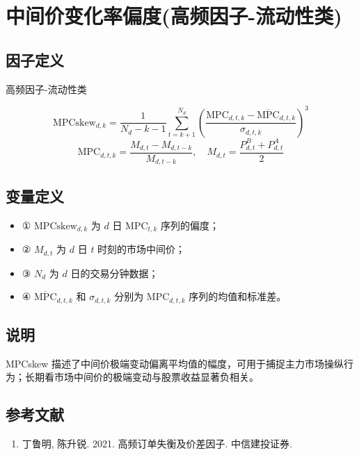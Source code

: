 \documentclass{article}
\begin{document}
\section{中间价变化率偏度(高频因子-流动性类)}

\subsection{因子定义}
高频因子-流动性类

\begin{equation}
    \mathrm{MPCskew}_{d,k} = \frac{1}{N_d - k - 1} \sum_{t=k+1}^{N_d} \left( \frac{\mathrm{MPC}_{d,t,k} - \overline{\mathrm{MPC}}_{d,t,k}}{\sigma_{d,t,k}} \right)^3
\end{equation}
\begin{equation}
    \mathrm{MPC}_{d,t,k} = \frac{M_{d,t} - M_{d,t-k}}{M_{d,t-k}}, \quad M_{d,t} = \frac{P_{d,t}^B + P_{d,t}^A}{2}
\end{equation}

\subsection{变量定义}
\begin{itemize}
    \item ① \( \mathrm{MPCskew}_{d,k} \) 为 \( d \) 日 \( \mathrm{MPC}_{t,k} \) 序列的偏度；
    \item ② \( M_{d,t} \) 为 \( d \) 日 \( t \) 时刻的市场中间价；
    \item ③ \( N_d \) 为 \( d \) 日的交易分钟数据；
    \item ④ \( \overline{\mathrm{MPC}}_{d,t,k} \) 和 \( \sigma_{d,t,k} \) 分别为 \( \mathrm{MPC}_{d,t,k} \) 序列的均值和标准差。
\end{itemize}

\subsection{说明}
MPCskew 描述了中间价极端变动偏离平均值的幅度，可用于捕捉主力市场操纵行为；长期看市场中间价的极端变动与股票收益显著负相关。

\subsection{参考文献}
\begin{enumerate}
    \item 丁鲁明, 陈升锐. 2021. 高频订单失衡及价差因子. 中信建投证券.
\end{enumerate}
\end{document}
